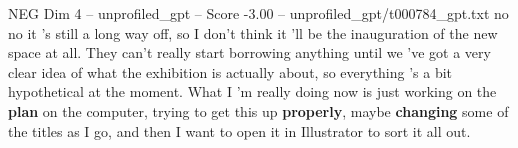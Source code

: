 \begin{textsample}{NEG Dim 4 – unprofiled\_gpt – Score -3.00 – unprofiled\_gpt/t000784\_gpt.txt}  \label{ex:f4_neg_028}
no no it 's still a long way off, so I don't think it 'll be the inauguration of the new space at all.
They can't really start borrowing anything until we 've got a very clear idea of what the exhibition is actually about, so everything 's a bit hypothetical at the moment.
What I 'm really doing now is just working on the \textbf{plan} on the computer, trying to get this up \textbf{properly}, maybe \textbf{changing} some of the titles as I go, and then I want to open it in Illustrator to sort it all out.

\end{textsample}
